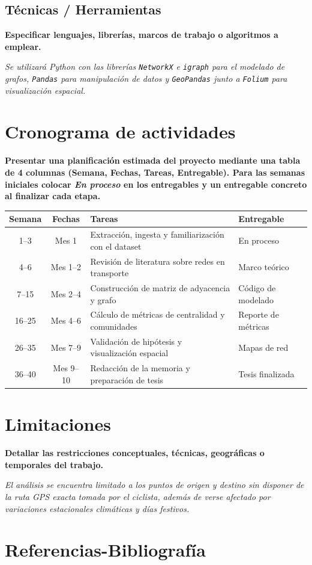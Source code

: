 \documentclass[12pt, a4paper]{article}
\begin{document}
\subsection{Técnicas / Herramientas}
\textbf{Especificar lenguajes, librerías, marcos de trabajo o algoritmos a emplear.}

\vspace{0.2cm}
\noindent \textit{Se utilizará Python con las librerías \texttt{NetworkX} e \texttt{igraph} para el modelado de grafos, \texttt{Pandas} para manipulación de datos y \texttt{GeoPandas} junto a \texttt{Folium} para visualización espacial.}

\section{Cronograma de actividades}
\textbf{Presentar una planificación estimada del proyecto mediante una tabla de 4 columnas (Semana, Fechas, Tareas, Entregable). Para las semanas iniciales colocar \textit{En proceso} en los entregables y un entregable concreto al finalizar cada etapa.}

\vspace{0.3cm}
\begin{center}
\small
\begin{tabular}{|c|c|p{6.5cm}|p{3.2cm}|}
\hline
\textbf{Semana} & \textbf{Fechas} & \textbf{Tareas} & \textbf{Entregable} \\ \hline
1--3 & Mes 1 & Extracción, ingesta y familiarización con el dataset & En proceso \\ \hline
4--6 & Mes 1--2 & Revisión de literatura sobre redes en transporte & Marco teórico \\ \hline
7--15 & Mes 2--4 & Construcción de matriz de adyacencia y grafo & Código de modelado \\ \hline
16--25 & Mes 4--6 & Cálculo de métricas de centralidad y comunidades & Reporte de métricas \\ \hline
26--35 & Mes 7--9 & Validación de hipótesis y visualización espacial & Mapas de red \\ \hline
36--40 & Mes 9--10 & Redacción de la memoria y preparación de tesis & Tesis finalizada \\ \hline
\end{tabular}
\end{center}

\section{Limitaciones}
\textbf{Detallar las restricciones conceptuales, técnicas, geográficas o temporales del trabajo.}

\vspace{0.2cm}
\noindent \textit{El análisis se encuentra limitado a los puntos de origen y destino sin disponer de la ruta GPS exacta tomada por el ciclista, además de verse afectado por variaciones estacionales climáticas y días festivos.}

\section{Referencias-Bibliografía}


\end{document}
